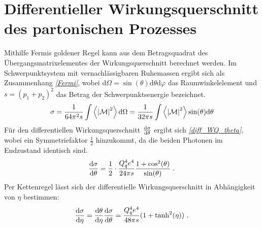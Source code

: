 \section{Differentieller Wirkungsquerschnitt des partonischen Prozesses}
\label{2.2}
Mithilfe Fermis goldener Regel kann aus dem Betragsquadrat des Übergangsmatrixelementes der Wirkungsquerschnitt berechnet werden.
Im Schwerpunktsystem mit vernachlässigbaren Ruhemassen ergibt sich als Zusammenhang \textit{\autoref{Fermi}}, wobei $\text{d}\Omega = \sin(\theta)\text{d}\theta\text{d}\varphi$ das Raumwinkelelement und $s = (p_1 + p_2)^2$ das Betrag der Schwerpunktsenergie bezeichnet.
\begin{equation}
\sigma = \frac{1}{64\pi^2s} \int \left\langle  \abs{\mathcal{M}}^2\right\rangle \text{d}\Omega = \frac{1}{32\pi s} \int \left\langle  \abs{\mathcal{M}}^2\right\rangle \sin(\theta) \text{d}\theta
\label{Fermi}
\end{equation}
Für den differentiellen Wirkungsquerschnitt $\derivative{\sigma}{\theta}$ ergibt sich \textit{\autoref{diff_WQ_theta}}, wobei ein Symmetriefaktor $\frac{1}{2}$ hinzukommt, da die beiden Photonen im Endzustand identisch sind.
\begin{equation}
\derivative{\sigma}{\theta} = \frac{1}{2} \cdot \frac{Q_q^4e^4}{24\pi s}\frac{1+\cos^2(\theta)}{\sin(\theta)} ~.
\label{diff_WQ_theta}
\end{equation}
Per Kettenregel lässt sich der differentielle Wirkungsquerschnitt in Abhängigkeit von $\eta$ bestimmen:
\begin{equation}
\derivative{\sigma}{\eta} =\derivative{\theta}{\eta}\derivative{\sigma}{\theta} =  \frac{Q_q^4e^4}{48\pi s}(1+\tanh^2(\eta))~.
\label{diff_WQ_eta}
\end{equation}
